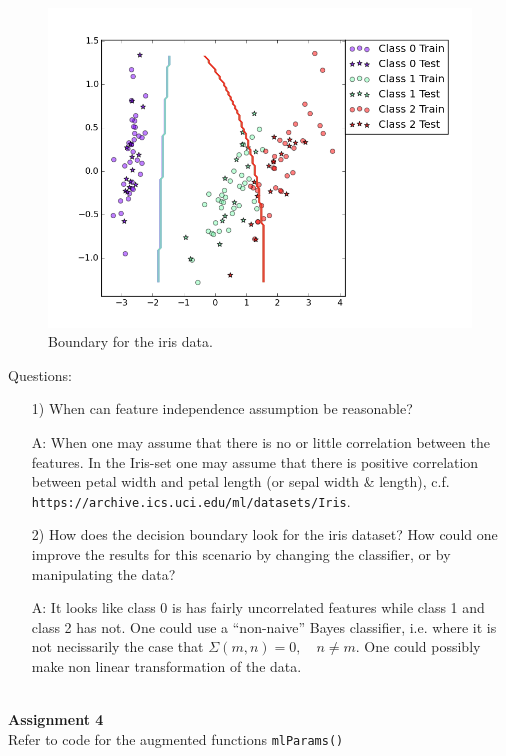 \documentclass[a4paper,10pt]{article}
\begin{document}
\FloatBarrier
\begin{figure}[h!]
  \center
  \includegraphics[width = 150mm]{figure_2.png}
  \vspace{-15mm}

  \begin{minipage}[t]{95mm}
    \caption{
      Boundary for the iris data.
    }
    \label{FIGas2}
  \end{minipage}
\end{figure}

\FloatBarrier
\noindent
Questions:
\begin{itemize}
  \item[1)] When can feature independence assumption be reasonable?
  \item[A:] When one may assume that there is no or little correlation between the 
    features. In the Iris-set one may assume that there is positive correlation
    between petal width and petal length (or sepal width \& length), c.f.
    \texttt{https://archive.ics.uci.edu/ml/datasets/Iris}.
  \item[2)] How does the decision boundary look for the iris dataset? How could one improve the
    results for this scenario by changing the classifier, or by manipulating the data?
  \item[A:] It looks like class 0 is has fairly uncorrelated features while class 1 and class 2 
    has not. One could use a ``non-naive'' Bayes classifier, i.e. where it is not 
    necissarily the case that 
    $\Sigma(m,n) = 0, \quad n \ne m$. One could possibly make non linear
    transformation of the data.
\end{itemize}
$ $\\
\textbf{Assignment 4}
\\
Refer to code for the augmented functions \texttt{mlParams()}
\end{document}
